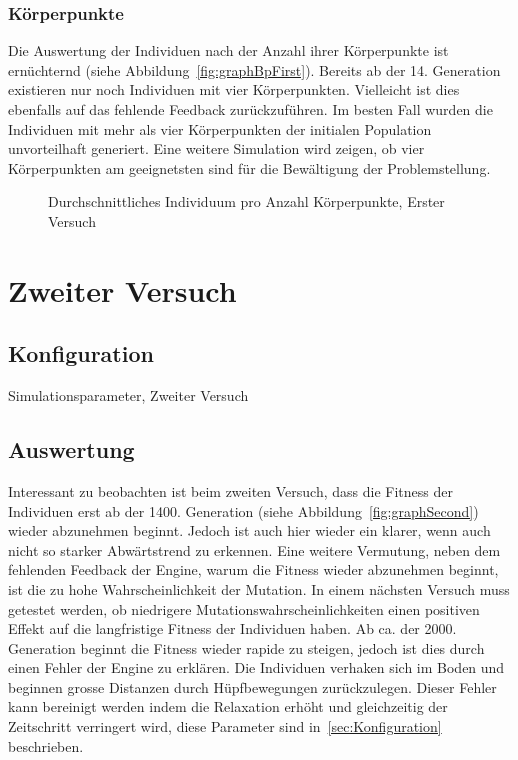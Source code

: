     \subsubsection{Körperpunkte\label{subsub:bp}}

      Die Auswertung der Individuen nach der Anzahl ihrer Körperpunkte ist ernüchternd (siehe Abbildung~\vref{fig:graphBpFirst}).
      Bereits ab der 14. Generation existieren nur noch Individuen mit vier Körperpunkten.
      Vielleicht ist dies ebenfalls auf das fehlende Feedback zurückzuführen.
      Im besten Fall wurden die Individuen mit mehr als vier Körperpunkten der initialen Population unvorteilhaft generiert.
      Eine weitere Simulation wird zeigen,
      ob vier Körperpunkten am geeignetsten sind für die Bewältigung der Problemstellung.

      \begin{figure}
        \centering
        
        \caption{Durchschnittliches Individuum pro Anzahl Körperpunkte, Erster Versuch\label{fig:graphBpFirst}}
      \end{figure}

  \section{Zweiter Versuch}

    \subsection{Konfiguration}

      \begin{table}[H]
        \centering
        
        \caption{Simulationsparameter, Zweiter Versuch}
      \end{table}

    \subsection{Auswertung}

      Interessant zu beobachten ist beim zweiten Versuch,
      dass die Fitness der Individuen erst ab der 1400\@. Generation (siehe Abbildung~\vref{fig:graphSecond})
      wieder abzunehmen beginnt.
      Jedoch ist auch hier wieder ein klarer, wenn auch nicht so starker Abwärtstrend zu erkennen.
      Eine weitere Vermutung, neben dem fehlenden Feedback der Engine, warum die Fitness wieder abzunehmen beginnt,
      ist die zu hohe Wahrscheinlichkeit der Mutation.
      In einem nächsten Versuch muss getestet werden,
      ob niedrigere Mutationswahrscheinlichkeiten einen positiven Effekt auf die langfristige Fitness der Individuen haben.
      Ab ca\@. der 2000\@. Generation beginnt die Fitness wieder rapide zu steigen,
      jedoch ist dies durch einen Fehler der Engine zu erklären.
      Die Individuen verhaken sich im Boden und beginnen grosse Distanzen durch Hüpfbewegungen zurückzulegen.
      Dieser Fehler kann bereinigt werden indem die Relaxation erhöht und gleichzeitig der Zeitschritt verringert wird,
      diese Parameter sind in~\vref{sec:Konfiguration} beschrieben.


